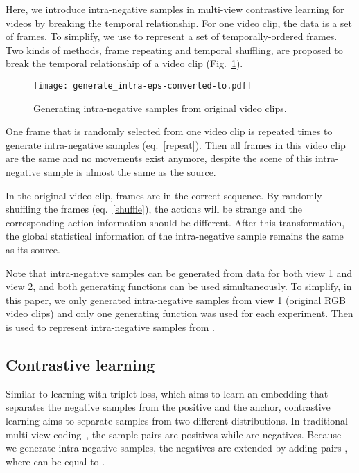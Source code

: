 \documentclass[sigconf]{acmart}
\begin{document}
Here, we introduce intra-negative samples in multi-view contrastive learning for videos by breaking the temporal relationship. For one video clip, the data  is a set of frames. To simplify, we use  to represent a set of temporally-ordered frames. Two kinds of methods, frame repeating and temporal shuffling, are proposed to break the temporal relationship of a video clip (Fig.~\ref{generate_intra}).

\begin{figure}[t]
  \centering
  \texttt{[image: generate\_intra-eps-converted-to.pdf]}
  \caption{Generating intra-negative samples from original video clips.}
  \label{generate_intra}
\end{figure} 

 One frame that is randomly selected from one video clip is repeated  times to generate intra-negative samples (eq.~\ref{repeat}). Then all frames in this video clip are the same and no movements exist anymore, despite the scene of this intra-negative sample is almost the same as the source.



 In the original video clip, frames are in the correct sequence. By randomly shuffling the frames (eq.~\ref{shuffle}), the actions will be strange and the corresponding action information should be different. After this transformation, the global statistical information of the intra-negative sample remains the same as its source.



Note that intra-negative samples can be generated from data for both view 1 and view 2, and both generating functions can be used simultaneously. To simplify, in this paper, we only generated intra-negative samples from view 1 (original RGB video clips) and only one generating function was used for each experiment. Then  is used to represent intra-negative samples from .


\subsection{Contrastive learning}
Similar to learning with triplet loss, which aims to learn an embedding that separates the negative samples from the positive and the anchor, contrastive learning aims to separate samples from two different distributions. In traditional multi-view coding~\cite{tian2019contrastive}, the sample pairs  are positives while  are negatives. Because we generate intra-negative samples, the negatives are extended by adding pairs , where  can be equal to .
\end{document}
